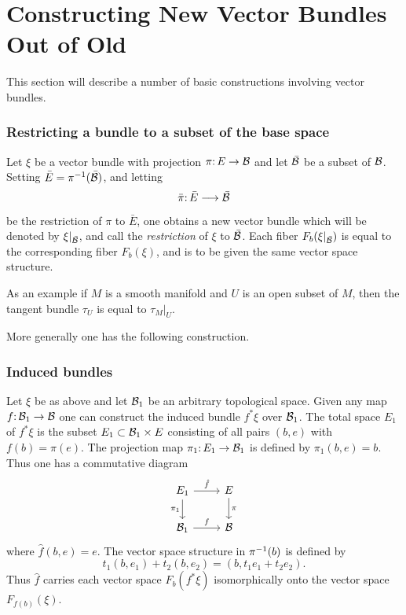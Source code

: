 \chapter{Constructing New Vector Bundles Out of Old}

This section will describe a number of basic constructions involving
vector bundles.

\subsection*{Restricting a bundle to a subset of the base space} Let $\xi$ be a
	vector bundle with projection $\pi\mathpunct{:} E\to \mathcal{B}$ and let $\bar{\mathcal{B}}$ be a subset of $\mathcal{B}$.
	Setting $\bar{E}=\pi^{-1}(\bar{\mathcal{B}})$, and letting
	\[\bar{\pi}\mathpunct{:}\bar{E}\longrightarrow \bar{\mathcal{B}} \]
	be the restriction of $\pi$ to $\bar{E}$, one obtains a new vector bundle which
	will be denoted by $\xi|_{\bar{\mathcal{B}}}$, and call the \textit{restriction} of $\xi$ to $\bar{\mathcal{B}}$. Each
	fiber $F_b(\xi|_{\bar{\mathcal{B}}})$ is equal to the corresponding fiber $F_b(\xi)$, and is to be
	given the same vector space structure.
	
	As an example if $M$ is a smooth manifold and $U$ is an open subset
	of $M$, then the tangent bundle $\tau_U$ is equal to $\tau_M|_{U}$.

More generally one has the following construction.


\subsection*{Induced bundles} Let $\xi$ be as above and let $\mathcal{B}_1$ be an arbitrary
	topological space. Given any map $f\mathpunct{:} \mathcal{B}_1\to \mathcal{B}$ one can construct the 
	induced bundle $f^*\xi$ over $\mathcal{B}_1$. The total space $E_1$ of $f^*\xi$ is the subset
	$E_1 \subset \mathcal{B}_1 \times E$ consisting of all pairs $(b, e)$ with
	$f(b)=\pi(e)$. The projection map $\pi_1\mathpunct{:}E_1\to \mathcal{B}_1$ is defined by $\pi_1(b,e)=b$. Thus one
	has a commutative diagram
\[\begin{tikzcd}
		E_1 \arrow[r, "\hat{f}"] \arrow[d, "\pi_1", swap] &E \arrow["\pi", d] \\
		\B_1 \arrow[r, "f"]           & \B          
\end{tikzcd}\]
where $\hat{f}(b, e) = e$. The vector space structure in $\pi^{-1}(b)$ is defined by
\[t_{1}\left(b, e_{1}\right)+t_{2}\left(b, e_{2}\right)=\left(b, t_{1} e_{1}+t_{2} e_{2}\right). \]
Thus $\hat{f}$ carries each vector space $F_b(f^*\xi)$ isomorphically onto the 
vector space $F_{f(b)}(\xi)$.

